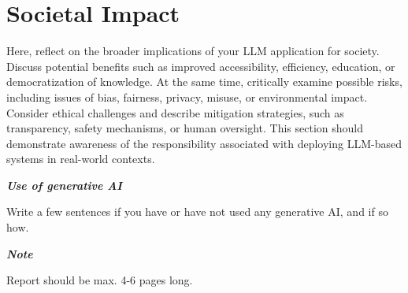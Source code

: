 \documentclass[a4paper,10pt]{article}
\begin{document}
\section{Societal Impact}
Here, reflect on the broader implications of your LLM application for society. Discuss potential benefits such as improved accessibility, efficiency, education, or democratization of knowledge. At the same time, critically examine possible risks, including issues of bias, fairness, privacy, misuse, or environmental impact. Consider ethical challenges and describe mitigation strategies, such as transparency, safety mechanisms, or human oversight. This section should demonstrate awareness of the responsibility associated with deploying LLM-based systems in real-world contexts.

	
\hfill \break
\textit{\textbf{Use of generative AI}}

Write a few sentences if you have or have not used any generative AI, and if so how.


\hfill \break
\textit{\textbf{Note}}

Report should be max. 4-6 pages long.

	
\begin{thebibliography}{1}

		
\end{thebibliography}

	
	
%	
%	
%	
\end{document}
